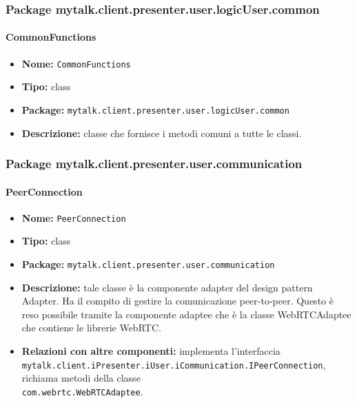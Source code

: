 \subsubsection{Package mytalk.client.presenter.user.logicUser.common}
\paragraph{CommonFunctions}{
	\begin{itemize}
		\item [] \textbf{Nome:} \texttt{CommonFunctions}
		\item [] \textbf{Tipo:} class
		\item [] \textbf{Package:} \texttt{mytalk.client.presenter.user.logicUser.common}
		\item [] \textbf{Descrizione:}{ classe che fornisce i metodi comuni a tutte le classi.}
	\end{itemize}
}
\subsubsection{Package mytalk.client.presenter.user.communication}
\paragraph{PeerConnection}{
	\begin{itemize}
		\item [] \textbf{Nome:} \texttt{PeerConnection}
		\item [] \textbf{Tipo:} class
		\item [] \textbf{Package:} \texttt{mytalk.client.presenter.user.communication}
		\item [] \textbf{Descrizione:} tale classe è la componente adapter del design pattern Adapter. Ha il compito di gestire la comunicazione peer-to-peer\g. Questo è reso possibile tramite la componente adaptee che è la classe WebRTCAdaptee che contiene le librerie WebRTC\g.
		\item [] \textbf{Relazioni con altre componenti:} implementa l'interfaccia\\ \texttt{mytalk.client.iPresenter.iUser.iCommunication.IPeerConnection}, richiama metodi della classe\\ \texttt{com.webrtc.WebRTCAdaptee}.
	\end{itemize}
}

